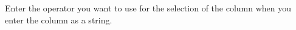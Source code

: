 
Enter the operator you want to use for the selection of the column when you enter the column as a string.

